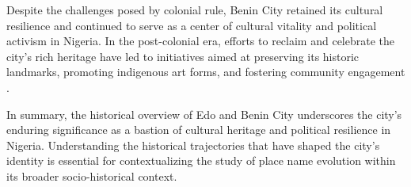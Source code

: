 Despite the challenges posed by colonial rule, Benin City retained its cultural resilience and continued to serve as a center of cultural vitality and political activism in Nigeria. In the post-colonial era, efforts to reclaim and celebrate the city's rich heritage have led to initiatives aimed at preserving its historic landmarks, promoting indigenous art forms, and fostering community engagement \cite{falola2008history}.

In summary, the historical overview of Edo and Benin City underscores the city's enduring significance as a bastion of cultural heritage and political resilience in Nigeria. Understanding the historical trajectories that have shaped the city's identity is essential for contextualizing the study of place name evolution within its broader socio-historical context.

